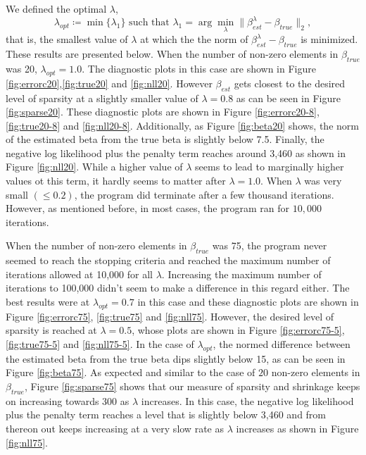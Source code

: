 \documentclass[12pt, leqno]{article}
\providecommand{\norm}[1]{\lVert#1\rVert}
\begin{document}
We defined the optimal $\lambda$, 
\[
\lambda_{opt} \coloneqq \min \{ \lambda_1 \} \text { such that } \lambda_{1}  = \arg\min_{\lambda} \norm{\beta_{est}^{\lambda} -
  \beta_{true}}_2,
\] 
that is, the smallest value of $\lambda$ at which the
the norm of
$\beta_{est}^{\lambda} - \beta_{true}$ is minimized. These results
are presented below. When the number of non-zero elements in
$\beta_{true}$ was 20, $\lambda_{opt} =1.0$. The
diagnostic plots in this case are shown in Figure
\ref{fig:errorc20},\ref{fig:true20} and \ref{fig:nll20}.  However
$\beta_{est}$ gets closest to the desired level of sparsity at a
slightly smaller value of $\lambda = 0.8$ as can be seen in Figure
\ref{fig:sparse20}. These
diagnostic plots are shown in Figure
\ref{fig:errorc20-8},\ref{fig:true20-8} and \ref{fig:nll20-8}. 
Additionally, as Figure \ref{fig:beta20} shows, the norm
of the estimated beta from the true beta is slightly below
7.5. Finally, the negative log likelihood plus the
penalty term reaches around 3,460 as shown in  Figure \ref{fig:nll20}. While a higher value of
$\lambda$ seems to lead to marginally higher values ot this term, it
hardly seems to matter after $\lambda = 1.0$.  When $\lambda$ was
very small $(\leq 0.2)$, the program did terminate after a few
thousand iterations. However, as mentioned before, in most cases, the
program ran for $10,000$ iterations. 

When the number of non-zero elements in $\beta_{true}$ was 75, the
program never seemed to reach the stopping criteria and reached the
maximum number of iterations allowed at 10,000 for all $\lambda$. Increasing the maximum
number of iterations to 100,000 didn't seem to make a difference in
this regard either. The best results were at $\lambda_{opt} = 0.7$ in
this case and these
diagnostic plots are shown in Figure
\ref{fig:errorc75}, \ref{fig:true75} and \ref{fig:nll75}. However, the
desired level of sparsity is reached at $\lambda = 0.5$, whose plots are shown in Figure
\ref{fig:errorc75-5}, \ref{fig:true75-5} and \ref{fig:nll75-5}.
In the case of $\lambda_{opt}$, the normed difference between the estimated beta from the true
beta dips slightly below 15, as can be
seen in Figure \ref{fig:beta75}. As expected and similar to the case of $20$ non-zero elements
in $\beta_{true}$, Figure \ref{fig:sparse75}
shows that our measure of sparsity and shrinkage keeps on increasing
towards 300 as $\lambda$ increases. In this case, the negative log likelihood plus the
penalty term reaches a level that is slightly below 3,460 and from thereon out keeps
increasing at a very
slow rate as $\lambda$ increases as shown in Figure
\ref{fig:nll75}.
\end{document}

